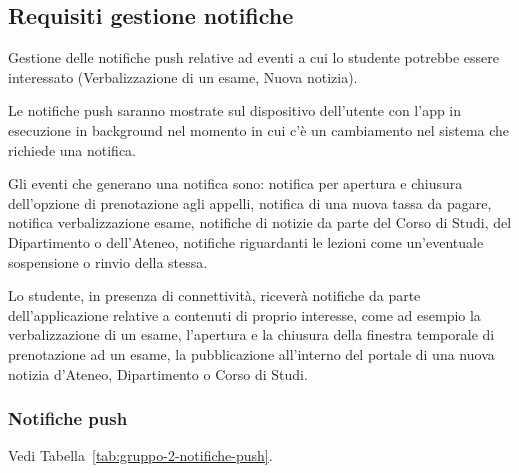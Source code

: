 \subsection{Requisiti gestione notifiche}

Gestione delle notifiche push relative ad eventi a cui lo studente potrebbe essere interessato (Verbalizzazione di un esame, Nuova notizia). 

Le notifiche push saranno mostrate sul dispositivo dell’utente con l’app in esecuzione in background nel momento in cui c’è un cambiamento nel sistema che richiede una notifica.  

Gli eventi che generano una notifica sono: notifica per apertura e chiusura dell'opzione di prenotazione agli appelli, notifica di una nuova tassa da pagare, notifica verbalizzazione esame, notifiche di notizie da parte del Corso di Studi, del Dipartimento o dell’Ateneo, notifiche riguardanti le lezioni come un’eventuale sospensione o rinvio della stessa.

Lo studente, in presenza di connettività, riceverà notifiche da parte dell’applicazione relative a contenuti di proprio interesse, come ad esempio la verbalizzazione di un esame, l’apertura e la chiusura della finestra temporale di prenotazione ad un esame, la pubblicazione all’interno del portale di una nuova notizia d’Ateneo, Dipartimento o Corso di Studi.

\subsubsection{Notifiche push} 

Vedi Tabella~\vref{tab:gruppo-2-notifiche-push}.

